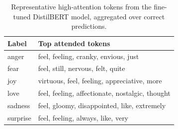 \begin{table}
\caption{Representative high-attention tokens from the fine-tuned DistilBERT model, aggregated over correct predictions.}
\label{tab:distilbert-attention-summary}
\begin{tabular}{ll}
\toprule
Label & Top attended tokens \\
\midrule
anger & feel, feeling, cranky, envious, just \\
fear & feel, still, nervous, felt, quite \\
joy & virtuous, feel, feeling, appreciative, more \\
love & feel, feeling, affectionate, nostalgic, thought \\
sadness & feel, gloomy, disappointed, like, extremely \\
surprise & feel, feeling, always, like, very \\
\bottomrule
\end{tabular}
\end{table}
